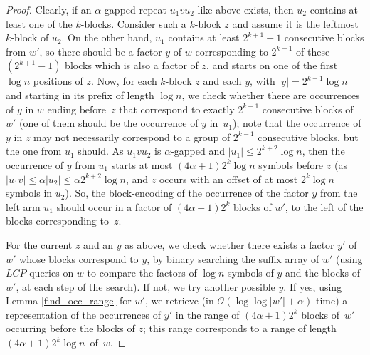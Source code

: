 \documentclass[final]{dmtcs-episciences}
\newcommand{\bigo}{{\mathcal O}}
\newcommand{\LCP}{{\mathit{LCP}}}
\begin{document}
\begin{proof}
Clearly, if an $\alpha$-gapped repeat $u_1vu_2$ like above exists, then $u_2$ contains at least one of the $k$-blocks. Consider such a $k$-block $z$ and assume it is the leftmost $k$-block of $u_2$. On the other hand, $u_1$ contains at least $2^{k+1}-1$ consecutive blocks from $w'$, so there should be a factor $y$ of $w$ corresponding to $2^{k-1}$ of these $(2^{k+1}-1)$ blocks which is also a factor of $z$, and starts on one of the first $\log n$ positions of $z$. Now, for each $k$-block $z$ and each $y$, with $|y|=2^{k-1}\log n$ and starting in its prefix of length $\log n$, we check whether there are occurrences of $y$ in $w$ ending before~$z$ that correspond to exactly $2^{k-1}$ consecutive blocks of $w'$ (one of them should be the occurrence of $y$ in~$u_1$); note that the occurrence of $y$ in $z$ may not necessarily correspond to a group of $2^{k-1}$ consecutive blocks, but the one from $u_1$ should. As $u_1vu_2$ is $\alpha$-gapped and $|u_1|\leq 2^{k+2}\log n$, then the occurrence of $y$ from $u_1$ starts at most $(4\alpha+1)2^{k} \log n$ symbols before $z$ (as $|u_1v|\leq \alpha |u_2|\leq \alpha 2^{k+2}\log n$, and $z$ occurs with an offset of at most $2^{k}\log n$ symbols in $u_2$). So, the block-encoding of the occurrence of the factor $y$ from the left arm $u_1$ should occur in a factor of $(4\alpha+1) 2^{k}$ blocks of $w'$, to the left of the blocks corresponding to~$z$.

For the current $z$ and an $y$ as above, we check whether there exists a factor $y'$ of $w'$ whose blocks correspond to $y$, by binary searching the suffix array of $w'$ (using $\LCP$-queries on $w$ to compare the factors of $\log n$ symbols of $y$ and the blocks of $w'$, at each step of the search). If not, we try another possible $y$. If yes, using Lemma \ref{find_occ_range} for $w'$, we retrieve (in $\bigo(\log\log |w'|+\alpha)$ time) a representation of the occurrences of $y'$ in the range of $(4\alpha+1)2^{k}$ blocks of~$w'$ occurring before the blocks of $z$; this range corresponds to a range of length $(4\alpha+1)2^{k} \log n$~of~$w$. 


\end{proof}
\end{document}
